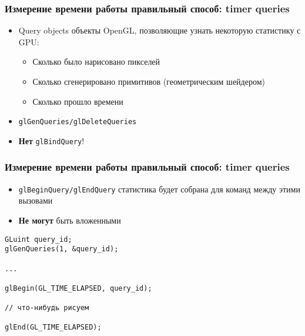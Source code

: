 \documentclass{beamer}
\begin{document}
\begin{frame}[fragile]
\frametitle{Измерение времени работы \textendash{} правильный способ: timer queries}
\begin{itemize}
\item Query objects \textendash{} объекты OpenGL, позволяющие узнать некоторую статистику с GPU:
\pause
\begin{itemize}
\item Сколько было нарисовано пикселей
\pause
\item Сколько сгенерировано примитивов (геометрическим шейдером)
\pause
\item Сколько прошло времени
\end{itemize}
\pause
\item \verb|glGenQueries/glDeleteQueries|
\pause
\item \textbf{Нет} \verb|glBindQuery|!
\end{itemize}
\end{frame}

\begin{frame}[fragile]
\frametitle{Измерение времени работы \textendash{} правильный способ: timer queries}
\begin{itemize}
\item \verb|glBeginQuery/glEndQuery| \textendash{} статистика будет собрана для команд между этими вызовами
\pause
\item \textbf{Не могут} быть вложенными
\end{itemize}
\pause
\begin{verbatim}
GLuint query_id;
glGenQueries(1, &query_id);

...

glBegin(GL_TIME_ELAPSED, query_id);

// что-нибудь рисуем

glEnd(GL_TIME_ELAPSED);
\end{verbatim}
\end{frame}
\end{document}
